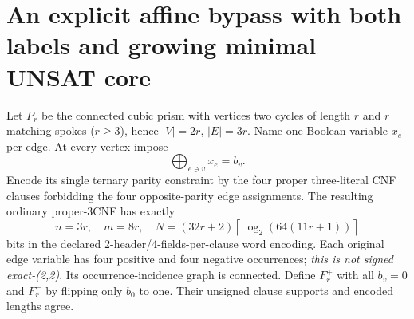 \documentclass[11pt]{article}
\begin{document}
\section{An explicit affine bypass with both labels and growing minimal UNSAT core}
Let $P_r$ be the connected cubic prism with vertices two cycles of length $r$ and $r$ matching spokes ($r\ge3$), hence $|V|=2r$, $|E|=3r$. Name one Boolean variable $x_e$ per edge. At every vertex impose
\[
  \bigoplus_{e\ni v}x_e=b_v.
\]
Encode its single ternary parity constraint by the four proper three-literal CNF clauses forbidding the four opposite-parity edge assignments. The resulting ordinary proper-3CNF has exactly
\[
 n=3r,\quad m=8r,\quad
 N=(32r+2)\left\lceil\log_2(64(11r+1))\right\rceil
\]
bits in the declared 2-header/4-fields-per-clause word encoding. Each original edge variable has four positive and four negative occurrences; \emph{this is not signed exact-(2,2)}. Its occurrence-incidence graph is connected. Define $F_r^+$ with all $b_v=0$ and $F_r^-$ by flipping only $b_0$ to one. Their unsigned clause supports and encoded lengths agree.
\end{document}
